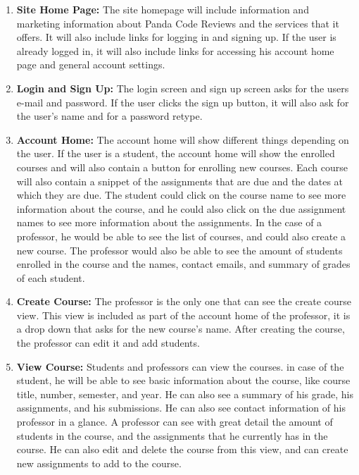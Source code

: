 \begin{enumerate}

\item \textbf{Site Home Page:} The site homepage will include information and
marketing information about Panda Code Reviews and the services that it offers.
It will also include links for logging in and signing up. If the user is already
logged in, it will also include links for accessing his account home page and
general account settings.

\item \textbf{Login and Sign Up:} The login screen and sign up screen asks for
the users e-mail and password. If the user clicks the sign up button, it will
also ask for the user's name and for a password retype.

\item \textbf{Account Home:} The account home will show different things
depending on the user. If the user is a student, the account home will show the
enrolled courses and will also contain a button for enrolling new courses. Each
course will also contain a snippet of the assignments that are due and the dates
at which they are due. The student could click on the course name to see more
information about the course, and he could also click on the due assignment
names to see more information about the assignments. In the case of a professor,
he would be able to see the list of courses, and could also create a new course.
The professor would also be able to see the amount of students enrolled in the
course and the names, contact emails, and summary of grades of each student.

\item \textbf{Create Course:} The professor is the only one that can see the
create course view. This view is included as part of the account home of the
professor, it is a drop down that asks for the new course's name. After creating
the course, the professor can edit it and add students.

\item \textbf{View Course:} Students and professors can view the courses. in
case of the student, he will be able to see basic information about the course,
like course title, number, semester, and year. He can also see a summary of his
grade, his assignments, and his submissions. He can also see contact information
of his professor in a glance. A professor can see with great detail the amount
of students in the course, and the assignments that he currently has in the
course. He can also edit and delete the course from this view, and can create
new assignments to add to the course.


\end{enumerate}
